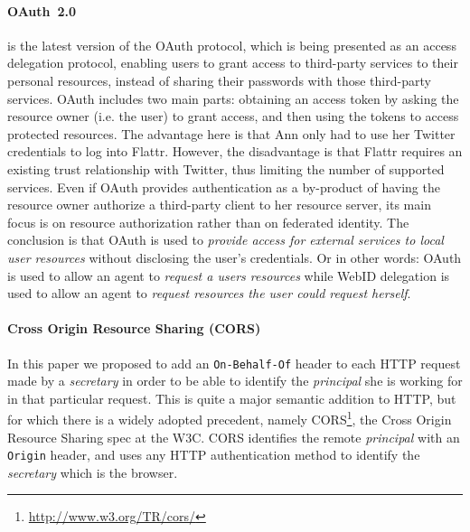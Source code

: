 \documentclass[a4paper]{llncs}
\begin{document}
\paragraph{OAuth~2.0}\cite{hardt-d-2012--a} is the latest version of the OAuth protocol, which is being presented as an access delegation protocol, enabling users to grant access to third-party services to their personal resources, instead of sharing their passwords with those third-party services.
OAuth includes two main parts: obtaining an access token by asking the resource owner (i.e. the user) to grant access, and then using the tokens to access protected resources. 
The advantage here is that Ann only had to use her Twitter credentials to log into Flattr.  However, the disadvantage is that Flattr requires an existing trust relationship with Twitter, thus limiting the number of supported services.
Even if OAuth provides authentication as a by-product of having the resource owner authorize a third-party client to her resource server, its main focus is on resource authorization rather than on federated identity.
The conclusion is that OAuth is used to \textit{provide access for external services to local user resources} without disclosing the user's credentials.
Or in other words: OAuth is used to allow an agent to \textit{request a users resources} while WebID delegation is used to allow an agent to \textit{request resources the user could request herself}.

\paragraph{Cross Origin Resource Sharing (CORS)}
In this paper we proposed to add an \lstinline|On-Behalf-Of| header to each HTTP request made by a \textit{secretary} in order to be able to identify the \textit{principal} she is working for in that particular request.
This is quite a major semantic addition to HTTP, but for which there is a widely adopted precedent, namely CORS\footnote{\url{http://www.w3.org/TR/cors/}}, the Cross Origin Resource Sharing spec at the W3C.
CORS identifies the remote \textit{principal} with an \lstinline|Origin| header, and uses any HTTP authentication method to identify the \textit{secretary} which is the browser.
\end{document}
